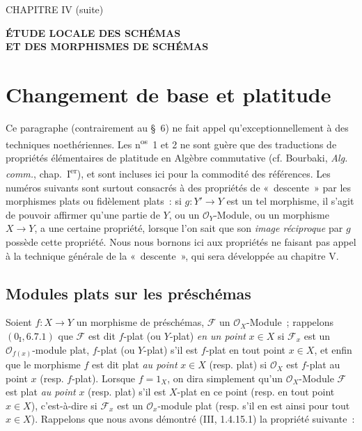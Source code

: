 \clearpage
\thispagestyle{plain}
\label{chapter:IV2-fr}

\begin{center}
{\large CHAPITRE IV (suite)\par}
\vspace{1.5em}
{\Large\bfseries ÉTUDE LOCALE DES SCHÉMAS\\
ET DES MORPHISMES DE SCHÉMAS\par}
\end{center}

\setcounter{section}{1}
\section{Changement de base et platitude}
\label{section:IV.2-fr}

Ce paragraphe (contrairement au \S~6) ne fait appel qu'exceptionnellement à
des techniques noethériennes. Les n\textsuperscript{os}~1 et 2 ne sont guère
que des traductions de propriétés élémentaires de platitude en Algèbre
commutative (cf. Bourbaki, \emph{Alg. comm.}, chap.~I\textsuperscript{er}), et
sont incluses ici pour la commodité des références. Les numéros suivants sont
surtout consacrés à des propriétés de «~descente~» par les morphismes plats ou
fidèlement plats~: si $g:Y'\to Y$ est un tel morphisme, il s'agit de pouvoir
affirmer qu'une partie de $Y$, ou un $\mathcal O_Y$-Module, ou un morphisme
$X\to Y$, a une certaine propriété, lorsque l'on sait que son \emph{image
réciproque} par $g$ possède cette propriété. Nous nous bornons ici aux
propriétés ne faisant pas appel à la technique générale de la «~descente~»,
qui sera développée au chapitre V.

\setcounter{subsection}{0}
\subsection{Modules plats sur les préschémas}
\label{subsection:IV.2.1-fr}

\begin{env}[2.1.1]
\label{IV.2.1.1-fr}
Soient $f:X\to Y$ un morphisme de préschémas, $\mathscr F$ un
$\mathcal O_X$-Module~; rappelons $(0_{\mathrm I},6.7.1)$ que $\mathscr F$ est
dit $f$-plat (ou $Y$-plat) \emph{en un point} $x\in X$ si $\mathscr F_x$ est
un $\mathcal O_{f(x)}$-module plat, $f$-plat (ou $Y$-plat) s'il est $f$-plat
en tout point $x\in X$, et enfin que le morphisme $f$ est dit plat \emph{au
point} $x\in X$ (resp. plat) si $\mathcal O_X$ est $f$-plat au point $x$
(resp. $f$-plat). Lorsque $f=1_X$, on dira simplement qu'un
$\mathcal O_X$-Module $\mathscr F$ est plat \emph{au point} $x$ (resp. plat)
s'il est $X$-plat en ce point (resp. en tout point $x\in X$), c'est-à-dire si
$\mathscr F_x$ est un $\mathcal O_x$-module plat (resp. s'il en est ainsi pour
tout $x\in X$). Rappelons que nous avons démontré (III, 1.4.15.1) la propriété
suivante~:
\end{env}

